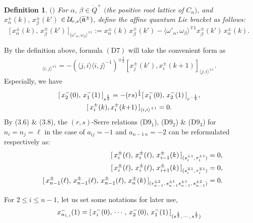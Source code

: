 \documentclass{amsproc}
\newtheorem{defi}[theo]{Definition}
\theoremstyle{remark}
\numberwithin{equation}{section}
\begin{document}
\begin{defi} $($\cite{HRZ}$)$
For $\alpha,\,\beta\in\dot Q^+$ $($the positive root lattice of $C_n)$,
and $x_\alpha^\pm(k),\,x_\beta^\pm(k')$ $\in
\mathcal{U}_{r,s}(\widetilde{\frak n}^\pm)$, define the {\rm affine}
quantum Lie bracket as follows:
$$\bigl[\,x_\alpha^\pm(k),\,
x_\beta^\pm(k')\,\bigr]_{{\langle}{\omega}'_\alpha,{\omega}_\beta{\rangle}^{\mp1}}:=
x_\alpha^\pm(k)\,x_\beta^\pm(k')-{\langle}{\omega}'_\alpha,{\omega}_\beta{\rangle}^{\mp1}
x_\beta^\pm(k')\,x_\alpha^\pm(k).
$$
\end{defi}
By the definition above, formula $(\textrm{D7})$ will take the
convenient form as
\begin{eqnarray*}
[x_i^\pm(k), x_j^\pm(k'{+}1)]_{{\langle} i, j{\rangle}^{\mp1}}=-({\langle} j, i{\rangle}{\langle}
i, j{\rangle}^{-1})^{\pm\frac1{2}}[x_j^\pm(k'), x_i^\pm(k{+}1)]_{{\langle} j,
i{\rangle}^{\mp1}}.
\end{eqnarray*}
Especially, we have
\begin{gather}
{\label{b:7}[\,x^{-}_2(0),\, x_1^{-}(1)\,]_{s^{\frac{1}{2}}}
=-(rs)^{\frac{1}{4}}[\,x^{-}_1(0),\, x_2^{-}(1)\,]_{r^{-\frac{1}{2}}},}\\
{\label{b:8}[\,x_i^\pm(k), x_i^\pm(k{+}1)\,]_{{\langle} i, i{\rangle}^{\mp1}}=0.}
\end{gather}
By (3.6) \& (3.8), the $(r,s)$-Serre relations (D$9_1$), (D$9_2$) \& (D$9_3$)
for $n_i=n_j=\ell$ in the case of $a_{ij}=-1$ and $a_{n-1\, n}=-2$ can be
reformulated respectively as:
\begin{eqnarray}
&&{\label{b:9}[\,x_i^{\pm}(\ell),
\,x_i^{\pm}(\ell),\,
x_{i-1}^{\pm}(k)\,]_{(s_i^{\pm1},\,r_i^{\pm1})}=0, } \\
&&{\label{b:10}[\,x_i^{\pm}(\ell),
\,x_i^{\pm}(\ell),\,
x_{i+1}^{\pm}(k)\,]_{(s_i^{\mp1},\,r_i^{\mp1})}=0,}  \\
&&{\label{b:11}[\,x_{n-1}^{\pm}(\ell),\, x_{n-1}^{\pm}(\ell),\,
x_{n-1}^{\pm}(\ell),\,x_n^{\pm}(k)\,]_{(r_{n-1}^{\pm2},\,s_{n-1}^{\pm1}s_{n-1}^{\pm1},
\,s_{n-1}^{\pm2})}=0.}
\end{eqnarray}

For $2\leqslant i \leqslant n-1$, let us set some notations for later use,
\begin{equation}
{\label{b:12}
\begin{split}
x_{\alpha_{1,i}}^-(1)=[\,x_i^-(0),\,\cdots,\,x_2^-(0),\,x_1^-(1)
\,]_{(s^{\frac{1}{2}},\,\cdots,\,s^{\frac{1}{2}})}
\end{split}}
\end{equation}
\medskip
\end{document}
